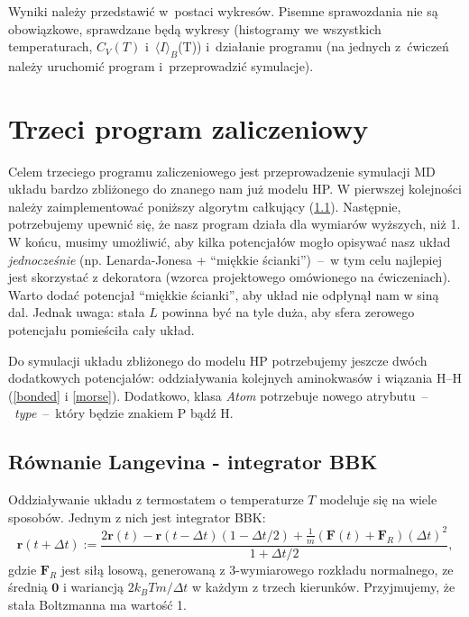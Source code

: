 \documentclass[a4paper,11pt,twoside]{book}
\begin{document}
Wyniki należy przedstawić w~postaci
wykresów. Pisemne sprawozdania nie są obowiązkowe, sprawdzane będą wykresy (histogramy we wszystkich temperaturach, $C_V(T)$ i~$\langle I \rangle_B$(T)) i~działanie programu (na jednych z~ćwiczeń należy uruchomić program i~przeprowadzić symulacje).

\chapter{Trzeci program zaliczeniowy}
Celem trzeciego programu zaliczeniowego jest przeprowadzenie symulacji MD układu bardzo zbliżonego do znanego nam już modelu HP.
W pierwszej kolejności należy zaimplementować poniższy algorytm całkujący (\ref{BBK}).
Następnie, potrzebujemy upewnić się, że nasz program działa dla wymiarów wyższych, niż 1.
W końcu, musimy umożliwić, aby kilka potencjałów mogło opisywać nasz układ \emph{jednocześnie} (np. Lenarda-Jonesa + ``miękkie ścianki'')~--~w tym celu najlepiej jest skorzystać z dekoratora (wzorca projektowego omówionego na ćwiczeniach).
Warto dodać potencjał ``miękkie ścianki'', aby układ nie odpłynął nam w siną dal.
Jednak uwaga: stała $L$ powinna być na tyle duża, aby sfera zerowego potencjału pomieściła cały układ.

Do symulacji układu zbliżonego do modelu HP potrzebujemy jeszcze dwóch dodatkowych potencjałów: oddziaływania kolejnych aminokwasów i wiązania H--H (\ref{bonded} i \ref{morse}).
Dodatkowo, klasa \emph{Atom} potrzebuje nowego atrybutu~--~\emph{type}~--~który będzie znakiem P bądź H.
\section{Równanie Langevina - integrator BBK}
\label{BBK}
Oddziaływanie układu z termostatem o temperaturze $T$ modeluje się na wiele sposobów.
Jednym z nich jest integrator BBK:
\begin{displaymath}
\mathbf{r}(t+\Delta t) := \frac{2 \mathbf{r}(t) -\mathbf{r}(t-\Delta t)( 1 - \Delta t/2 ) + \frac{1}{m} ( \mathbf{F}(t) + \mathbf{F}_R ) (\Delta t)^2 }{1 + \Delta t / 2 },
\end{displaymath}
gdzie $\mathbf{F}_R$ jest siłą losową, generowaną z 3-wymiarowego rozkładu normalnego, ze średnią $\mathbf{0}$ i wariancją $2 k_B T m / \Delta t$ w każdym z trzech kierunków.
Przyjmujemy, że stała Boltzmanna ma wartość 1.
\end{document}
